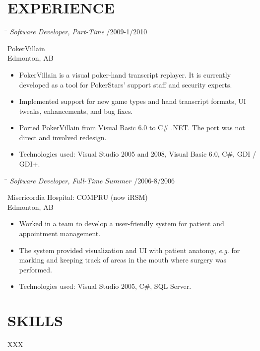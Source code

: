 \documentclass{res}
\begin{document}
\begin{resume}
\section{EXPERIENCE}
    \vspace{-0.1in}
    \begin{tabbing}
    \hspace{5.15in}\= \kill  %
    \textit{Software Developer, Part-Time} /2009-1/2010
    \end{tabbing}\vspace{-22pt}  %
    PokerVillain\\
    Edmonton, AB\\
    \vspace{-2.5ex}\begin{itemize}[noitemsep]
    \item PokerVillain is a visual poker-hand transcript replayer.  It is currently developed as a tool for PokerStars' support staff and security experts.
    \item Implemented support for new game types and hand transcript formats, UI tweaks, enhancements, and bug fixes.
    \item Ported PokerVillain from Visual Basic 6.0 to C\# .NET.  The port was not direct and involved redesign.
    \item Technologies used: Visual Studio 2005 and 2008, Visual Basic 6.0, C\#, GDI / GDI+.
    \end{itemize}

    \vspace{-0.1in}
    \begin{tabbing}
    \hspace{5.15in}\= \kill  %
    \textit{Software Developer, Full-Time \(Summer\)} /2006-8/2006
    \end{tabbing}\vspace{-22pt}  %
    Misericordia Hospital: COMPRU (now iRSM)\\
    Edmonton, AB\\
    \vspace{-2.5ex}\begin{itemize}[noitemsep]
    \item Worked in a team to develop a user-friendly system for patient and appointment management.
    \item The system provided visualization and UI with patient anatomy, \textit{e.g.} for marking and keeping track of areas in the mouth where surgery was performed.
    \item Technologies used: Visual Studio 2005, C\#, SQL Server.
    \end{itemize}


\section{SKILLS}
    XXX


\end{resume}
\end{document}
